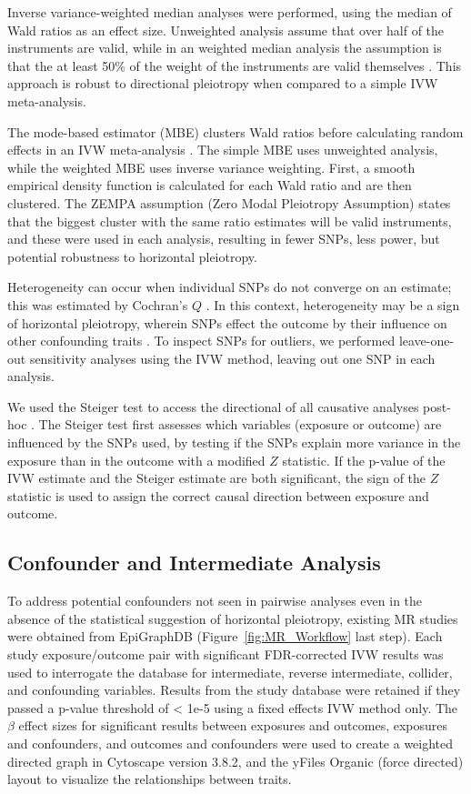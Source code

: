 \documentclass[journal,article,submit,moreauthors,pdftex]{Definitions/mdpi}
\begin{document}
Inverse variance-weighted median analyses were performed, using the median of  Wald ratios as an effect size. Unweighted analysis assume that over half of the instruments are valid, while in an weighted median analysis the assumption is that the at least 50\% of the weight of the instruments are valid themselves \cite{bowden_consistent_2016}. This approach is robust to directional pleiotropy when compared to a simple IVW meta-analysis.

The mode-based estimator (MBE) clusters Wald ratios before calculating random effects in an IVW meta-analysis \cite{hartwigRobustInferenceSummary2017a}. The simple MBE uses unweighted analysis, while the weighted MBE uses inverse variance weighting. First, a smooth empirical density function is calculated for each Wald ratio and are then clustered. The ZEMPA assumption (Zero Modal Pleiotropy Assumption) states that the biggest cluster with the same ratio estimates will be valid instruments, and these were used in each analysis, resulting in fewer SNPs, less power, but potential robustness to horizontal pleiotropy.

Heterogeneity can occur when individual SNPs do not converge on an estimate; this was estimated by Cochran's $Q$ \cite{higgins_cochrane_2011}. In this context, heterogeneity may be a sign of horizontal pleiotropy, wherein SNPs effect the outcome by their influence on other confounding traits  \cite{burgess_review_2017}. To inspect SNPs for outliers, we performed leave-one-out sensitivity analyses using the IVW method, leaving out one SNP in each analysis. 

We used the Steiger test to access the directional of all causative analyses post-hoc \cite{hemaniOrientingCausalRelationship2017}. The Steiger test first assesses which variables (exposure or outcome) are influenced by the SNPs used, by testing if the SNPs explain more variance in the exposure than in the outcome with a modified $Z$ statistic. If the p-value of the IVW estimate and the Steiger estimate are both significant, the sign of the $Z$ statistic is used to assign the correct causal direction between exposure and outcome.

\subsection{Confounder and Intermediate Analysis}
To address potential confounders not seen in pairwise analyses even in the absence of the statistical suggestion of horizontal pleiotropy, existing MR studies were obtained from EpiGraphDB (Figure~\ref{fig:MR_Workflow} last step). Each study exposure/outcome pair with significant FDR-corrected IVW results was used to interrogate the database for intermediate, reverse intermediate, collider, and confounding variables. Results from the study database were retained if they passed a p-value threshold of < 1e-5 using a fixed effects IVW method only. The $\beta$ effect sizes for significant results between exposures and outcomes, exposures and confounders, and outcomes and confounders were used to create a weighted directed graph in Cytoscape \cite{shannon_cytoscape_2003} version 3.8.2, and the yFiles Organic (force directed) layout to visualize the relationships between traits. 
\end{document}
